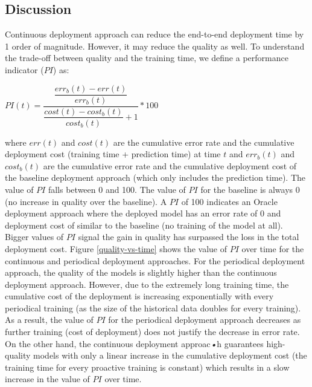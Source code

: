 \subsection{Discussion} \label{subsec:discussion}
Continuous deployment approach can reduce the end-to-end deployment time by 1 order of magnitude.
However, it may reduce the quality as well.
To understand the trade-off between quality and the training time, we define a performance indicator ($PI$) as:\\
\begin{center}
$PI(t) = \dfrac{\dfrac{err_b(t) - err(t)}{err_b(t)}}{\dfrac{cost(t) - cost_b(t)}{cost_b(t)}+ 1}   * 100$
\end{center}
where $err(t)$ and $cost(t)$ are the cumulative error rate and the cumulative deployment cost (training time + prediction time) at time $t$ and  $err_b(t)$ and $cost_b(t)$ are the cumulative error rate and the cumulative deployment cost of the baseline deployment approach (which only includes the prediction time).
The value of $PI$ falls between 0 and 100.
The value of $PI$ for the baseline is always 0 (no increase in quality over the baseline).
A $PI$ of 100 indicates an Oracle deployment approach where the deployed model has an error rate of 0 and deployment cost of similar to the baseline (no training of the model at all).
Bigger values of $PI$ signal the gain in quality has surpassed the loss in the total deployment cost.
Figure \ref{quality-vs-time} shows the value of $PI$ over time for the continuous and periodical deployment approaches.
For the periodical deployment approach, the quality of the models is slightly higher than the continuous deployment approach.
However, due to the extremely long training time, the cumulative cost of the deployment is increasing exponentially with every periodical training (as the size of the historical data doubles for every training).
As a result, the value of $PI$ for the periodical deployment approach decreases as further training (cost of deployment) does not justify the decrease in error rate.
On the other hand, the continuous deployment approac\emph{•}h guarantees high-quality models with only a linear increase in the cumulative deployment cost (the training time for every proactive training is constant) which results in a slow increase in the value of $PI$ over time. 

